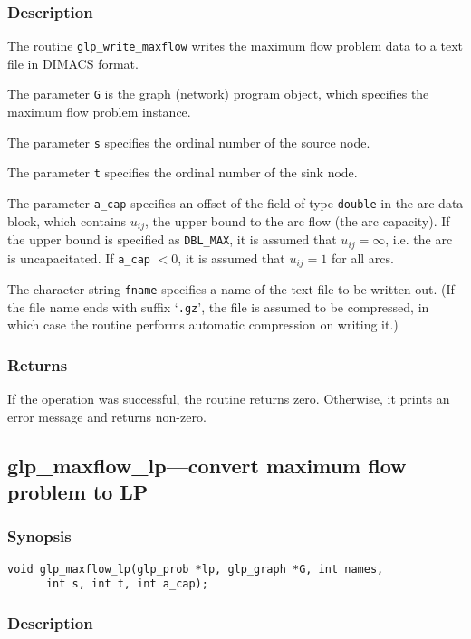 \documentclass[dvipdfm,11pt]{report}
\begin{document}
\subsubsection*{Description}

The routine \verb|glp_write_maxflow| writes the maximum flow problem
data to a text file in DIMACS format.

The parameter \verb|G| is the graph (network) program object, which
specifies the maximum flow problem instance.

The parameter \verb|s| specifies the ordinal number of the source node.

The parameter \verb|t| specifies the ordinal number of the sink node.

The parameter \verb|a_cap| specifies an offset of the field of type
\verb|double| in the arc data block, which contains $u_{ij}$, the upper
bound to the arc flow (the arc capacity). If the upper bound is
specified as \verb|DBL_MAX|, it is assumed that $u_{ij}=\infty$, i.e.
the arc is uncapacitated. If \verb|a_cap| $<0$, it is assumed that
$u_{ij}=1$ for all arcs.

The character string \verb|fname| specifies a name of the text file to
be written out. (If the file name ends with suffix `\verb|.gz|', the
file is assumed to be compressed, in which case the routine performs
automatic compression on writing it.)

\subsubsection*{Returns}

If the operation was successful, the routine returns zero. Otherwise,
it prints an error message and returns non-zero.

\subsection{glp\_maxflow\_lp---convert maximum flow problem to LP}

\subsubsection*{Synopsis}

\begin{verbatim}
void glp_maxflow_lp(glp_prob *lp, glp_graph *G, int names,
      int s, int t, int a_cap);
\end{verbatim}

\subsubsection*{Description}
\end{document}
